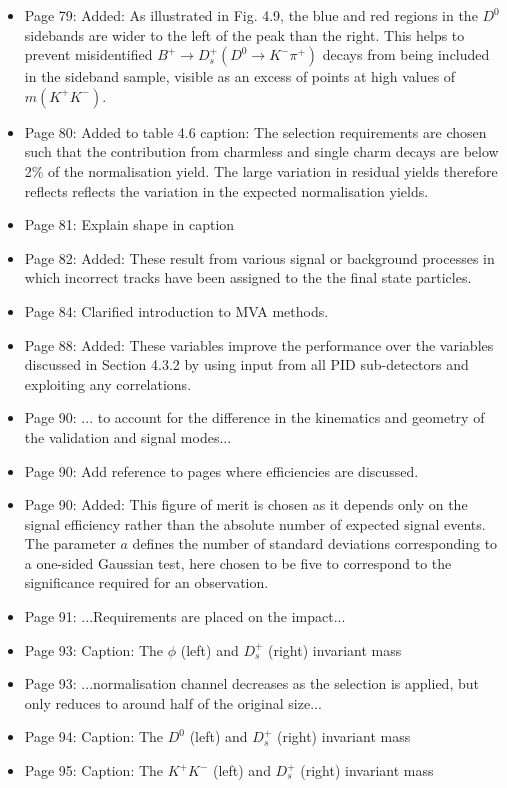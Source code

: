 \documentclass[12pt]{article}
\begin{document}
\begin{itemize}
\item Page 79: Added: {\color{red} As illustrated in Fig. 4.9, the blue and red regions in the $D^0$ sidebands are wider to the left of the peak than the right. This helps to prevent misidentified $B^+\rightarrow D_s^+ (D^0 \rightarrow K^-\pi^+)$ decays from being included in the sideband sample, visible as an excess of points at high values of $m(K^+K^-)$.}
\item Page 80: Added to table 4.6 caption: {\color{red} The selection requirements are chosen such that the contribution from charmless and single charm decays are below 2\% of the normalisation yield. The large variation in residual yields therefore reflects reflects the variation in the expected normalisation yields.}
\item Page 81: {\color{blue}Explain shape in caption}
\item Page 82: Added: {\color{red} These result from various signal or background processes in which incorrect tracks have been assigned to the the final state particles.}
\item Page 84: Clarified introduction to MVA methods.
\item Page 88: Added: {\color{red}These variables improve the performance over the variables discussed in Section 4.3.2 by using input from all PID sub-detectors and exploiting any correlations.}
\item Page 90: ... {\color{red}to account for the difference in the kinematics and geometry of the validation and signal modes}...
\item Page 90: Add reference to pages where efficiencies are discussed.
\item Page 90: Added: {\color{red} This figure of merit is chosen as it depends only on the signal efficiency rather than the absolute number of expected signal events. The parameter $a$ defines the number of standard deviations corresponding to a one-sided Gaussian test, here chosen to be five to correspond to the significance required for an observation.}
\item Page 91: ...Requirements are {\color{red}placed} on the impact... 
\item Page 93: Caption: The {\color{red}$\phi$ (left) and $D_{s}^{+}$ (right)} invariant mass
\item Page 93: ...normalisation channel {\color{red}decreases as the selection is applied, but only reduces to around half of the original size}...
\item Page 94: Caption: The {\color{red}$D^{0}$ (left) and $D_{s}^{+}$ (right)} invariant mass
\item Page 95: Caption: The {\color{red}$K^+K^-$ (left) and $D_{s}^{+}$ (right)} invariant mass


\end{itemize}
\end{document}
